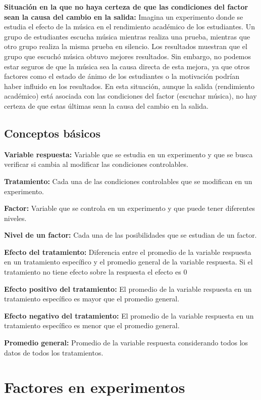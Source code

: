 \documentclass[
]{article}
\begin{document}
\textbf{Situación en la que no haya certeza de que las condiciones del
factor sean la causa del cambio en la salida:} Imagina un experimento
donde se estudia el efecto de la música en el rendimiento académico de
los estudiantes. Un grupo de estudiantes escucha música mientras realiza
una prueba, mientras que otro grupo realiza la misma prueba en silencio.
Los resultados muestran que el grupo que escuchó música obtuvo mejores
resultados. Sin embargo, no podemos estar seguros de que la música sea
la causa directa de esta mejora, ya que otros factores como el estado de
ánimo de los estudiantes o la motivación podrían haber influido en los
resultados. En esta situación, aunque la salida (rendimiento académico)
está asociada con las condiciones del factor (escuchar música), no hay
certeza de que estas últimas sean la causa del cambio en la salida.

\subsection{Conceptos básicos}\label{conceptos-buxe1sicos}

\textbf{Variable respuesta:} Variable que se estudia en un experimento y
que se busca verificar si cambia al modificar las condiciones
controlables.

\textbf{Tratamiento:} Cada una de las condiciones controlables que se
modifican en un experimento.

\textbf{Factor:} Variable que se controla en un experimento y que puede
tener diferentes niveles.

\textbf{Nivel de un factor:} Cada una de las posibilidades que se
estudian de un factor.

\textbf{Efecto del tratamiento:} Diferencia entre el promedio de la
variable respuesta en un tratamiento específico y el promedio general de
la variable respuesta. Si el tratamiento no tiene efecto sobre la
respuesta el efecto es 0

\textbf{Efecto positivo del tratamiento:} El promedio de la variable
respuesta en un tratamiento específico es mayor que el promedio general.

\textbf{Efecto negativo del tratamiento:} El promedio de la variable
respuesta en un tratamiento específico es menor que el promedio general.

\textbf{Promedio general:} Promedio de la variable respuesta
considerando todos los datos de todos los tratamientos.

\section{Factores en experimentos}\label{factores-en-experimentos}
\end{document}
